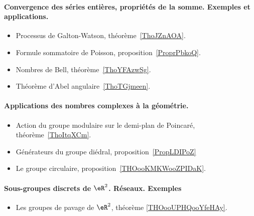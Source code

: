 \paragraph{Convergence des séries entières, propriétés de la somme. Exemples et applications.}
\begin{itemize}
    \item Processus de Galton-Watson, théorème~\ref{ThoJZnAOA}.
    \item Formule sommatoire de Poisson, proposition~\ref{ProprPbkoQ}.
    \item Nombres de Bell, théorème~\ref{ThoYFAzwSg}.
    \item Théorème d'Abel angulaire~\ref{ThoTGjmeen}.
\end{itemize}
\paragraph{Applications des nombres complexes à la géométrie.}
\begin{itemize}
    \item Action du groupe modulaire sur le demi-plan de Poincaré, théorème~\ref{ThoItqXCm}.
    \item Générateurs du groupe diédral, proposition~\ref{PropLDIPoZ}
    \item Le groupe circulaire, proposition~\ref{THOooKMKWooZPIDaK}.
\end{itemize}
\paragraph{Sous-groupes discrets de \( \eR^2\). Réseaux. Exemples}
\begin{itemize}
    \item Les groupes de pavage de \( \eR^2\), théorème \ref{THOooUPHQooYfeHAy}.
\end{itemize}
